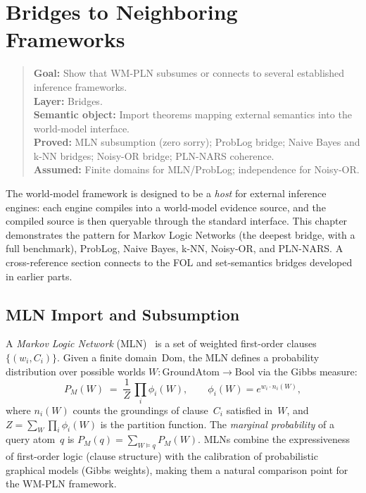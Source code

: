 \documentclass[11pt,openany]{report}
\begin{document}
\chapter{Bridges to Neighboring Frameworks}
\label{ch:bridges}

\begin{quote}\small
\textbf{Goal:} Show that WM-PLN subsumes or connects to several established inference frameworks.\\
\textbf{Layer:} Bridges.\\
\textbf{Semantic object:} Import theorems mapping external semantics into the world-model interface.\\
\textbf{Proved:} MLN subsumption (zero sorry); ProbLog bridge; Naive Bayes and k-NN bridges; Noisy-OR bridge; PLN-NARS coherence.\\
\textbf{Assumed:} Finite domains for MLN/ProbLog; independence for Noisy-OR.
\end{quote}

The world-model framework is designed to be a \emph{host} for external
inference engines: each engine compiles into a world-model evidence
source, and the compiled source is then queryable through the standard
interface.  This chapter demonstrates the pattern for Markov Logic
Networks (the deepest bridge, with a full benchmark), ProbLog, Naive
Bayes, k-NN, Noisy-OR, and PLN-NARS.  A cross-reference section
connects to the FOL and set-semantics bridges developed in earlier
parts.
\section{MLN Import and Subsumption}
\label{sec:mln-subsumption}

A \emph{Markov Logic Network}
(MLN)~\cite{RichardsonDomingos2006} is a set of weighted first-order
clauses $\{(w_i, C_i)\}$.  Given a finite domain~$\mathrm{Dom}$, the
MLN defines a probability distribution over possible worlds
$W : \mathrm{GroundAtom} \to \mathrm{Bool}$ via the Gibbs measure:
\[
  P_M(W) \;=\; \frac{1}{Z}\,\prod_i \phi_i(W),
  \qquad
  \phi_i(W) = e^{w_i \cdot n_i(W)},
\]
where $n_i(W)$ counts the groundings of clause~$C_i$ satisfied in~$W$,
and $Z = \sum_W \prod_i \phi_i(W)$ is the partition function.  The
\emph{marginal probability} of a query atom~$q$ is
$P_M(q) = \sum_{W \models q} P_M(W)$.  MLNs combine the expressiveness
of first-order logic (clause structure) with the calibration of
probabilistic graphical models (Gibbs weights), making them a natural
comparison point for the WM-PLN framework.
\end{document}
